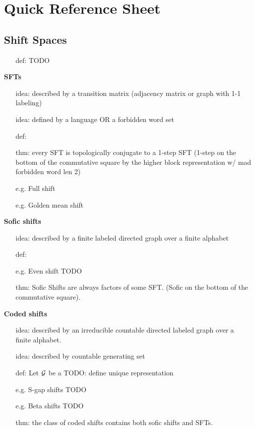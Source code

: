 \documentclass[11pt, reqno]{amsart}
\theoremstyle{plain}
\numberwithin{thm}{subsection}
\theoremstyle{definition}
\begin{document}
\section{Quick Reference Sheet}
{\setlength{\parindent}{0pt} 
\begin{multicols}{2}

\subsection{Shift Spaces}
\begin{itemize}[leftmargin=2.3em]
\item[def:] TODO  
\end{itemize}

\textbf{SFTs}  
\begin{itemize}[leftmargin=2.3em]
\item[idea:] described by a transition matrix (adjacency matrix or graph with 1-1 labeling)  
\item[idea:] defined by a language OR a forbidden word set  
\item[def:]   
\item[thm:] every SFT is topologically conjugate to a 1-step SFT (1-step on the bottom of the commutative square by the higher block representation w/ mad forbidden word len 2)  
\item[e.g.] Full shift   
\item[e.g.] Golden mean shift  
\end{itemize}

\textbf{Sofic shifts}
\begin{itemize}[leftmargin=2.3em]
  \item[idea:] described by a finite labeled directed graph over a finite alphabet
  \item[def:]  
  \item[e.g.] Even shift TODO
  \item[thm:] Sofic Shifts are always factors of some SFT. (Sofic on the bottom of the commutative square).
\end{itemize}

\textbf{Coded shifts}
\begin{itemize}[leftmargin=2.3em]
  \item[idea:] described by an irreducible countable directed labeled graph over a finite alphabet.
  \item[idea:] described by countable generating set 
  \item[def:] Let $\mathcal{G}$ be a TODO: define unique representation
  \item[e.g.] S-gap shifts TODO
  \item[e.g.] Beta shifts TODO
  \item[thm:] the class of coded shifts contains both sofic shifts and SFTs.
\end{itemize}


\end{multicols}}
\end{document}
